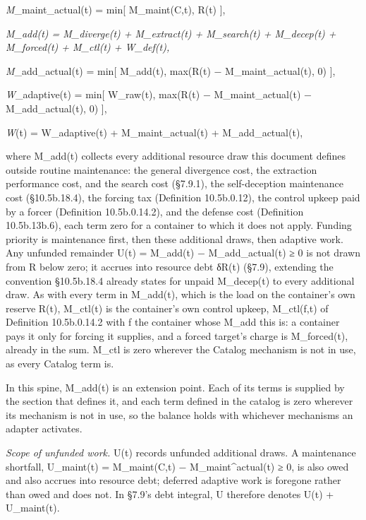 \documentclass[
]{article}
\begin{document}
\emph{M}\_maint\_actual(t) = min{[} M\_maint(C,t), R(t) {]},

\emph{M\_add(t) = M\_diverge(t) + M\_extract(t) + M\_search(t) +
M\_decep(t) + M\_forced(t) + M\_ctl(t) + W\_def(t),}

\emph{M}\_add\_actual(t) = min{[} M\_add(t), max(R(t) −
M\_maint\_actual(t), 0) {]},

\emph{W}\_adaptive(t) = min{[} W\_raw(t), max(R(t) − M\_maint\_actual(t)
− M\_add\_actual(t), 0) {]},

\emph{W}(t) = W\_adaptive(t) + M\_maint\_actual(t) + M\_add\_actual(t),

where M\_add(t) collects every additional resource draw this document
defines outside routine maintenance: the general divergence cost, the
extraction performance cost, and the search cost (§7.9.1), the
self-deception maintenance cost (§10.5b.18.4), the forcing tax
(Definition 10.5b.0.12), the control upkeep paid by a forcer (Definition
10.5b.0.14.2), and the defense cost (Definition 10.5b.13b.6), each term
zero for a container to which it does not apply. Funding priority is
maintenance first, then these additional draws, then adaptive work. Any
unfunded remainder U(t) = M\_add(t) − M\_add\_actual(t) ≥ 0 is not drawn
from R below zero; it accrues into resource debt δR(t) (§7.9), extending
the convention §10.5b.18.4 already states for unpaid M\_decep(t) to
every additional draw. As with every term in M\_add(t), which is the
load on the container's own reserve R(t), M\_ctl(t) is the container's
own control upkeep, M\_ctl(f,t) of Definition 10.5b.0.14.2 with f the
container whose M\_add this is: a container pays it only for forcing it
supplies, and a forced target's charge is M\_forced(t), already in the
sum. M\_ctl is zero wherever the Catalog mechanism is not in use, as
every Catalog term is.

In this spine, M\_add(t) is an extension point. Each of its terms is
supplied by the section that defines it, and each term defined in the
catalog is zero wherever its mechanism is not in use, so the balance
holds with whichever mechanisms an adapter activates.

\emph{Scope of unfunded work.} U(t) records unfunded additional draws. A
maintenance shortfall, U\_maint(t) = M\_maint(C,t) −
M\_maint\^{}actual(t) ≥ 0, is also owed and also accrues into resource
debt; deferred adaptive work is foregone rather than owed and does not.
In §7.9's debt integral, U therefore denotes U(t) + U\_maint(t).
\end{document}

